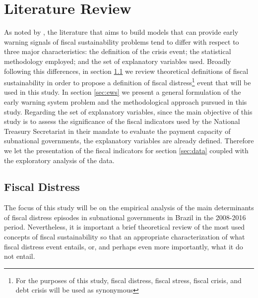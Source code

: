 \chapter{Literature Review}
\label{sec:literature-review}

As noted by \citet{baldacci2011b}, the literature that aims to build models that can provide early warning signals of fiscal sustainability problems tend to differ with respect to three major characteristics: the definition of the crisis event; the statistical methodology employed; and the set of explanatory variables used. Broadly following this differences, in section \ref{sec:fiscal-distress} we review theoretical definitions of fiscal sustainability in order to propose a definition of fiscal distress\footnote{For the purposes of this study, fiscal distress, fiscal stress, fiscal crisis, and debt crisis will be used as synonymous} event that will be used in this study. In section \ref{sec:ews} we present a general formulation of the early warning system problem and the methodological approach pursued in this study. Regarding the set of explanatory variables, since the main objective of this study is to assess the significance of the fiscal indicators used by the National Treasury Secretariat in their mandate to evaluate the payment capacity of subnational governments, the explanatory variables are already defined. Therefore we let the presentation of the fiscal indicators for section \ref{sec:data} coupled with the exploratory analysis of the data.



\section{Fiscal Distress}
\label{sec:fiscal-distress}

The focus of this study will be on the empirical analysis of the main determinants of fiscal distress episodes in subnational governments in Brazil in the 2008-2016 period. Nevertheless, it is important a brief theoretical review of the most used concepts of fiscal sustainability so that an appropriate characterization of what fiscal distress event entails, or, and perhaps even more importantly, what it do not entail.

